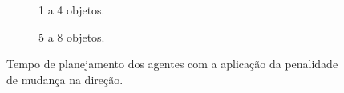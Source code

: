 \begin{figure}[h]
  \centering
  \setlength{\fboxsep}{0pt}

  \begin{subfigure}[t]{0.49\textwidth}
    \centering
    \caption{1 a 4 objetos.}
  \end{subfigure}
  \begin{subfigure}[t]{0.49\textwidth}
    \centering
    \caption{5 a 8 objetos.}
  \end{subfigure}
  \caption{Tempo de planejamento dos agentes com a aplicação da penalidade de mudança na direção.}
  \label{fig:ambiente_penalizacao_tempo_com}
\end{figure}

